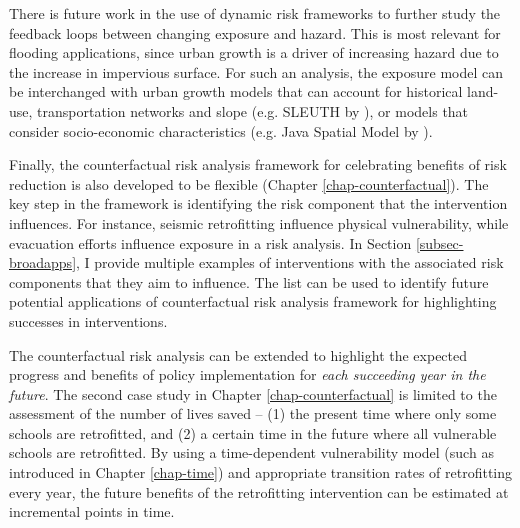     There is future work in the use of dynamic risk frameworks to further study the feedback loops between changing exposure and hazard. This is most relevant for flooding applications, since urban growth is a driver of increasing hazard due to the increase in impervious surface. For such an analysis, the exposure model can be interchanged with urban growth models that can account for historical land-use, transportation networks and slope (e.g. SLEUTH by \citet{clarke_self-modifying_1997}), or models that consider socio-economic characteristics (e.g. Java Spatial Model by \citet{zondag_use_2009, noauthor_river_2016, sjarief_integration_2003}). 

    
    Finally, the counterfactual risk analysis framework for celebrating benefits of risk reduction is also developed to be flexible (Chapter \ref{chap-counterfactual}). The key step in the framework is identifying the risk component that the intervention influences. For instance, seismic retrofitting influence physical vulnerability, while evacuation efforts influence exposure in a risk analysis. In Section \ref{subsec-broadapps}, I provide multiple examples of interventions with the associated risk components that they aim to influence. The list can be used to identify future potential applications of counterfactual risk analysis framework for highlighting successes in interventions.

    The counterfactual risk analysis can be extended to highlight the expected progress and benefits of policy implementation for \textit{each succeeding year in the future}. The second case study in Chapter \ref{chap-counterfactual} is limited to the assessment of the number of lives saved -- (1) the present time where only some schools are retrofitted, and (2) a certain time in the future where all vulnerable schools are retrofitted. By using a time-dependent vulnerability model (such as introduced in Chapter \ref{chap-time}) and appropriate transition rates of retrofitting every year, the future benefits of the retrofitting intervention can be estimated at incremental points in time.

